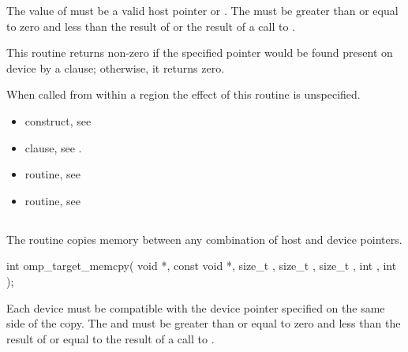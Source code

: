 \begin{ccppspecific}
The value of  must be a valid host pointer or .
The 
must be greater than or equal to zero and less than the result of
 or the result of a call to
.

\effect

This routine returns non-zero if the specified pointer
would be found present on device  by a 
clause; otherwise, it returns zero.

When called from within a  region
the effect of this routine is unspecified.

\crossreferences
\begin{itemize}
\item {} construct, see 

\item {} clause, see .

\item {} routine, see

\item {} routine, see
\end{itemize}


\subsection{}
\label{subsec:omp_target_memcpy}
\summary

The  routine copies memory between any combination
of host and device pointers.

\format
\begin{ompcFunction}
int omp_target_memcpy(
  void *,
  const void *,
  size_t ,
  size_t ,
  size_t ,
  int ,
  int 
);
\end{ompcFunction}

\constraints
Each device must
be compatible with the device pointer specified on the same side of the copy.
The  and 
must be greater than or equal to zero and less than the result of
 or equal to the result of a call to
.


\end{ccppspecific}
